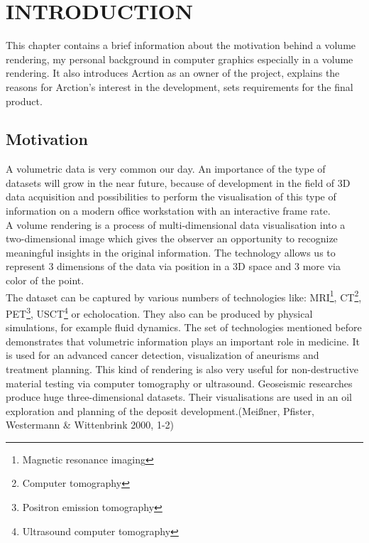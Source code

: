 \documentclass[twoside, english, 11pt]{report}
\begin{document}
\newpage

\tableofcontents

\chapter{INTRODUCTION}
This chapter contains a brief information about the motivation behind a volume rendering, my personal background in computer graphics especially in a volume rendering. It also introduces Acrtion as an owner of the project, explains the reasons for Arction's interest in the development, sets requirements for the final product.
\section{Motivation}

A volumetric data is very common our day. An importance of the type of datasets will grow in the near future, because of development in the field of 3D data acquisition and possibilities to perform the visualisation of this type of information on a modern office workstation with an interactive frame rate.\\

A volume rendering is a process of multi-dimensional data visualisation into a two-dimensional image which gives the observer an opportunity to recognize meaningful insights in the original information. The technology allows us to represent 3 dimensions of the data via position in a 3D space and 3 more via color of the point.\\

The dataset can be captured by various numbers of technologies like: MRI\footnote{Magnetic resonance imaging}, CT\footnote{Computer tomography}, PET\footnote{Positron emission tomography}, USCT\footnote{Ultrasound computer tomography} or echolocation. They also can be produced by physical simulations, for example fluid dynamics. The set of technologies mentioned before demonstrates that volumetric information plays an important role in medicine. It is used for an advanced cancer detection, visualization of aneurisms and treatment planning. This kind of rendering is also very useful for non-destructive material testing via computer tomography or ultrasound. Geoseismic researches produce huge three-dimensional datasets. Their visualisations are used in an oil exploration and planning of the deposit development.(Meißner, Pfister, Westermann \& Wittenbrink 2000, 1-2)\\
\end{document}
